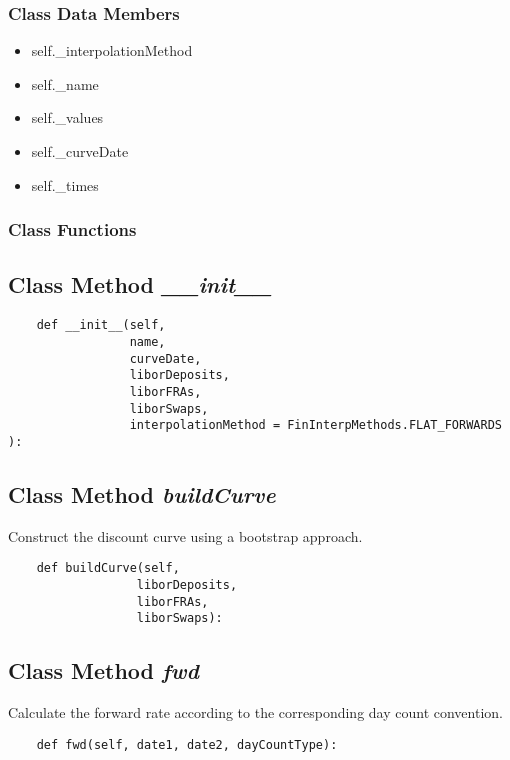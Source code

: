 \documentclass[twoside,11pt]{book}
\begin{document}
\subsubsection{Class Data Members}
\begin{itemize}
\item{self.\_interpolationMethod}
\item{self.\_name}
\item{self.\_values}
\item{self.\_curveDate}
\item{self.\_times}
\end{itemize}

\subsubsection{Class Functions}

\subsection{Class Method {\it \_\_init\_\_}}


\begin{lstlisting}
    def __init__(self, 
                 name, 
                 curveDate, 
                 liborDeposits,
                 liborFRAs,
                 liborSwaps,
                 interpolationMethod = FinInterpMethods.FLAT_FORWARDS ):
\end{lstlisting}

\subsection{Class Method {\it buildCurve}}
Construct the discount curve using a bootstrap approach. 

\begin{lstlisting}
    def buildCurve(self,
                  liborDeposits,
                  liborFRAs,
                  liborSwaps):
\end{lstlisting}

\subsection{Class Method {\it fwd}}
Calculate the forward rate according to the corresponding day count convention. 

\begin{lstlisting}
    def fwd(self, date1, date2, dayCountType):
\end{lstlisting}
\end{document}
